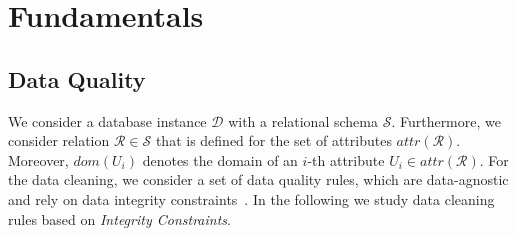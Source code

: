 \section{Fundamentals}
\label{sec:expl}


\subsection{Data Quality}

We consider a database instance $\mathcal{D}$ with a relational schema $\mathcal{S}$. Furthermore, we consider relation $\mathcal{R} \in \mathcal{S}$ that is defined for the set of attributes $attr(\mathcal{R})$. Moreover, $dom(U_i)$ denotes the domain of an $i$-th attribute $U_i \in attr(\mathcal{R})$. For the data cleaning, we consider a set of data quality rules, which are data-agnostic and rely on data integrity constraints~\cite{AbiteboulHV95}. In the following we study data cleaning rules based on \emph{Integrity Constraints}.

